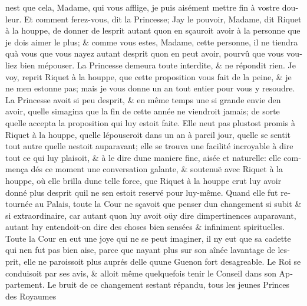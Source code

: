 \documentclass[14pt,a4paper]{memoir}
\begin{document}
\begin{otherlanguage}{french}
n\textquotesingle est que cela, Madame, qui vous afflige, je puis
aisément mettre fin à vostre douleur. Et comment ferez-vous, dit la
Princesse; J\textquotesingle ay le pouvoir, Madame, dit Riquet à la
houppe, de donner de l\textquotesingle esprit autant
qu\textquotesingle on en sçauroit avoir à la personne que je dois aimer
le plus; \& comme vous estes, Madame, cette personne, il ne tiendra
qu\textquotesingle à vous que vous n\textquotesingle ayez autant
d\textquotesingle esprit qu\textquotesingle on en peut avoir, pourvû que
vous vouliez bien m\textquotesingle épouser. La Princesse demeura toute
interdite, \& ne répondit rien. Je voy, reprit Riquet à la houppe, que
cette proposition vous fait de la peine, \& je ne m\textquotesingle en
estonne pas; mais je vous donne un an tout entier pour vous y resoudre.
La Princesse avoit si peu d\textquotesingle esprit, \& en même temps une
si grande envie d\textquotesingle en avoir, qu\textquotesingle elle
s\textquotesingle imagina que la fin de cette année ne viendroit jamais;
de sorte qu\textquotesingle elle accepta la proposition qui luy estoit
faite. Elle n\textquotesingle eut pas plustost promis à Riquet à la
houppe, qu\textquotesingle elle l\textquotesingle épouseroit dans un an
à pareil jour, qu\textquotesingle elle se sentit tout autre
qu\textquotesingle elle n\textquotesingle estoit auparavant; elle se
trouva une facilité incroyable à dire tout ce qui luy plaisoit, \& à le
dire d\textquotesingle une maniere fine, aisée et naturelle: elle
commença dés ce moment une conversation galante, \& soutenuë avec Riquet
à la houppe, où elle brilla d\textquotesingle une telle force, que
Riquet à la houppe crut luy avoir donné plus d\textquotesingle esprit
qu\textquotesingle il ne s\textquotesingle en estoit reservé pour
luy-même. Quand elle fut retournée au Palais, toute la Cour ne sçavoit
que penser d\textquotesingle un changement si subit \& si
extraordinaire, car autant qu\textquotesingle on luy avoit oüy dire
d\textquotesingle impertinences auparavant, autant luy entendoit-on dire
des choses bien sensées \& infiniment spirituelles. Toute la Cour en eut
une joye qui ne se peut imaginer, il n\textquotesingle y eut que sa
cadette qui n\textquotesingle en fut pas bien aise, parce que
n\textquotesingle ayant plus sur son aînée l\textquotesingle avantage de
l\textquotesingle esprit, elle ne paroissoit plus auprés
d\textquotesingle elle qu\textquotesingle une Guenon fort desagreable.
Le Roi se conduisoit par ses avis, \& alloit même quelquefois tenir le
Conseil dans son Appartement. Le bruit de ce changement
s\textquotesingle estant répandu, tous les jeunes Princes des Royaumes

\end{otherlanguage}
\end{document}
